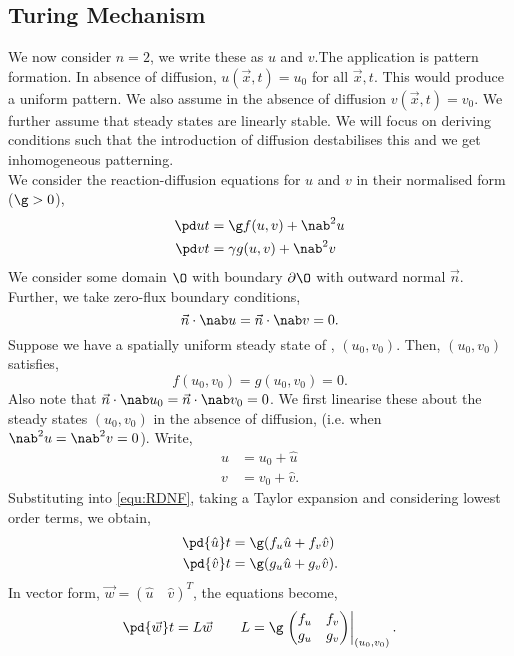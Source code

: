 
\subsection{Turing Mechanism}
We now consider $n = 2$, we write these as $u$ and $v$.The application is pattern formation. In absence of diffusion, $u(\vec x, t) = u_0$ for all $\vec x, t$. This would produce a uniform pattern. We also assume in the absence of diffusion $ v(\vec x, t) = v_0$. We further assume that steady states are linearly stable. We will focus on deriving conditions such that the introduction of diffusion destabilises this and we get inhomogeneous patterning. \\

\noindent
We consider the reaction-diffusion equations for $u$ and $v$ in their normalised form ($\g > 0$),
\begin{equation}
  \begin{aligned}
    \pd u t &= \g f(u, v) + \nab^2 u \\
    \pd v t &= \gamma g(u, v) + \nab^2 v
  \end{aligned}\label{equ:RDNF}
\end{equation}
We consider some domain $\O$ with boundary $\partial \O$ with outward normal $\vec n$. Further, we take zero-flux boundary conditions,
$$ \vec n \cdot \nab u = \vec n \cdot \nab v = 0. $$
Suppose we have a spatially uniform steady state of , $(u_0, v_0)$. Then, $(u_0, v_0)$ satisfies,
$$ f(u_0, v_0) = g(u_0, v_0) = 0. $$
Also note that $\vec n \cdot \nab u_0 = \vec n \cdot \nab v_0 = 0$. We first linearise these about the steady states $(u_0, v_0)$ in the absence of diffusion, (i.e. when $\nab^2 u = \nab^2 v = 0$). Write,
\begin{align*}
  u &= u_0 + \hat u \\
  v &= v_0 + \hat v.
\end{align*}
Substituting into \ref{equ:RDNF}, taking a Taylor expansion and considering lowest order terms, we obtain,
\begin{align*}
  \pd {\hat u} t &= \g (f_u\hat u + f_v\hat v)\\
  \pd {\hat v} t &= \g (g_u\hat u + g_v\hat v).
\end{align*}
In vector form, $\vec w = (\hat u \quad \hat v)^T$, the equations become,
$$ \pd {\vec w} t = L\vec w \qquad L = \g \left.\begin{pmatrix}
  f_u & f_v \\ g_u & g_v
\end{pmatrix}\right|_{(u_0, v_0)}. $$

